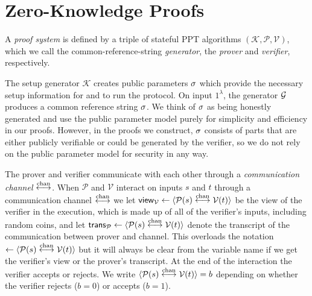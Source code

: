 \section{Zero-Knowledge Proofs}
\label{shvzkdef}

A \emph{proof system} is defined by a triple of stateful PPT algorithms $(\mathcal{K},\mathcal{P},\mathcal{V})$, which we call the common-reference-string \emph{generator}, the \emph{prover} and \emph{verifier}, respectively.

The setup generator $\mathcal{K}$ creates public parameters $\mathsf{\sigma}$ which provide the necessary setup information for \prover and \verifier to run the protocol. On input $1^\lambda$, the generator $\mathcal{G}$ produces a common reference string $\mathsf{\sigma}$. We think of $\mathsf{\sigma}$ as being honestly generated and use the public parameter model purely for simplicity and efficiency in our proofs. However, in the proofs we construct, $\mathsf{\sigma}$ consists of parts that are either publicly verifiable or could be generated by the verifier, so we do not rely on the public parameter model for security in any way.

The prover and verifier communicate with each other through a \emph{communication channel} $\overset{\textnormal{chan}}{\longleftrightarrow}$. When $\mathcal{P}$ and $\mathcal{V}$ interact on inputs $s$ and $t$ through a communication channel $\overset{\textnormal{chan}}{\longleftrightarrow}$ we let $\mathsf{view}_{\mathcal{V}} \leftarrow \langle \mathcal{P}(s) \overset{\textnormal{chan}}{\longleftrightarrow} \mathcal{V}(t)\rangle$ be the view of the verifier in the execution, which is made up of all of the verifier's inputs, including random coins, and let $\mathsf{trans}_{\mathcal{P}} \leftarrow  \langle \mathcal{P}(s) \overset{\textnormal{chan}}{\longleftrightarrow} \mathcal{V}(t)\rangle$ denote the transcript of the communication between prover and channel. This overloads the notation $\leftarrow  \langle \mathcal{P}(s) \overset{\textnormal{chan}}{\longleftrightarrow} \mathcal{V}(t)\rangle$ but it will always be clear from the variable name if we get the verifier's view or the prover's transcript. At the end of the interaction the verifier accepts or rejects. We write $\langle \mathcal{P}(s)\overset{\textnormal{chan}}{\longleftrightarrow} \mathcal{V}(t)\rangle =b$ depending on whether the verifier rejects ($b=0$) or accepts ($b=1$).

